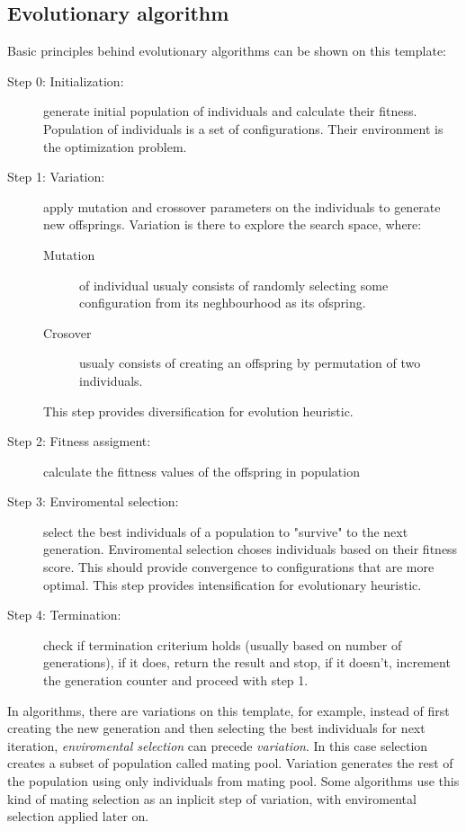 \documentclass[12pt,oneside]{fithesis2}
\begin{document}
\subsection{Evolutionary algorithm}
Basic principles behind evolutionary algorithms can be shown on this template\cite{talbi2009metaheuristics}: 
\begin{description}
	\item[Step 0: Initialization:] generate initial population of individuals and calculate their fitness. Population of individuals is a set of configurations. Their environment is the optimization problem.
    \item[Step 1: Variation:] apply mutation and crossover parameters on the individuals to generate new offsprings. Variation is there to explore the search space, where: 
        \begin{description}
            \item[Mutation] of individual usualy consists of randomly selecting some configuration from its neghbourhood as its ofspring.
            \item[Crosover] usualy consists of creating an offspring by permutation of two individuals. 
        \end{description}
        This step provides diversification for evolution heuristic.
	\item[Step 2: Fitness assigment:] calculate the fittness values of the offspring in population
	\item[Step 3: Enviromental selection:] select the best individuals of a population to "survive" to the next generation. Enviromental selection choses individuals based on their fitness score. This should provide convergence to configurations that are more optimal. This step provides intensification for evolutionary heuristic.
	\item[Step 4: Termination:] check if termination criterium holds (usually based on number of generations), if it does, return the result and stop, if it doesn't, increment the generation counter and proceed with step 1.
\end{description}

In algorithms, there are variations on this template, for example, instead of first creating the new generation and then selecting the best individuals for next iteration, \emph{enviromental selection} can precede \emph{variation}. In this case selection creates a subset of population called mating pool. Variation generates the rest of the population using only individuals from mating pool. Some algorithms use this kind of mating selection as an inplicit step of variation, with enviromental selection applied later on. 
\end{document}
